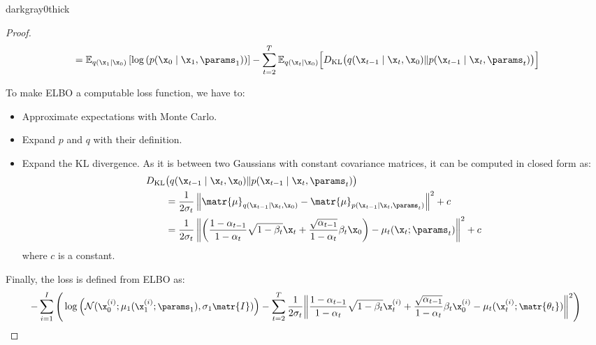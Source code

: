 \begin{description}
\begin{description}
\begin{marginbar}{darkgray}{0}{thick}
\begin{proof}
\[\begin{aligned}
                            &= \mathbb{E}_{q(\x_1 \mid \x_0)}\left[ \log\left( p(\x_0 \mid \x_1, \params_1) \right) \right] - \sum_{t=2}^{T} \mathbb{E}_{q(\x_t \mid \x_0)}\Big[ D_\text{KL}\big(q(\x_{t-1} \mid \x_t, \x_0) \Vert p(\x_{t-1} \mid \x_t, \params_t)\big) \Big] \\
                        \end{aligned}
                    \]

                    To make ELBO a computable loss function, we have to:
                    \begin{itemize}
                        \item Approximate expectations with Monte Carlo.
                        \item Expand $p$ and $q$ with their definition. 
                        \item Expand the KL divergence. As it is between two Gaussians with constant covariance matrices, it can be computed in closed form as:
                        \[ 
                            \begin{split}
                                D_\text{KL}&\big(q(\x_{t-1} \mid \x_t, \x_0) \Vert p(\x_{t-1} \mid \x_t, \params_t)\big) \\
                                &= \frac{1}{2\sigma_t} \left\Vert \matr{\mu}_{q(\x_{t-1} \mid \x_t, \x_0)} - \matr{\mu}_{p(\x_{t-1} \mid \x_t, \params_t)} \right\Vert^2 + c \\
                                &= \frac{1}{2\sigma_t} \left\Vert \left(\frac{1-\alpha_{t-1}}{1-\alpha_t} \sqrt{1-\beta_t} \x_t + \frac{\sqrt{\alpha_{t-1}}}{1-\alpha_t} \beta_t \x_0\right) - \mu_t(\x_t; \params_t) \right\Vert^2 + c
                            \end{split}
                        \]
                        where $c$ is a constant.
                    \end{itemize}

                    Finally, the loss is defined from ELBO as:
                    \[
                        \small
                        - \sum_{i=1}^{I}\Bigg( 
                            \log\left( \mathcal{N}(\x_0^{(i)}; \mu_1(\x_1^{(i)}; \params_1), \sigma_1\matr{I}) \right) -
                            \sum_{t=2}^{T} \frac{1}{2\sigma_t} \bigg\Vert 
                                \frac{1-\alpha_{t-1}}{1-\alpha_t} \sqrt{1-\beta_t} \x_t^{(i)} + \frac{\sqrt{\alpha_{t-1}}}{1-\alpha_t}\beta_t\x_0^{(i)} -
                                \mu_t(\x_t^{(i)}; \matr{\theta_t}) \vphantom{\frac{\sqrt{0_0}}{0_0}}
                            \bigg\Vert^2
                        \Bigg)
                    \]
                \end{proof}
                \end{marginbar}
        \end{description}



\end{description}
